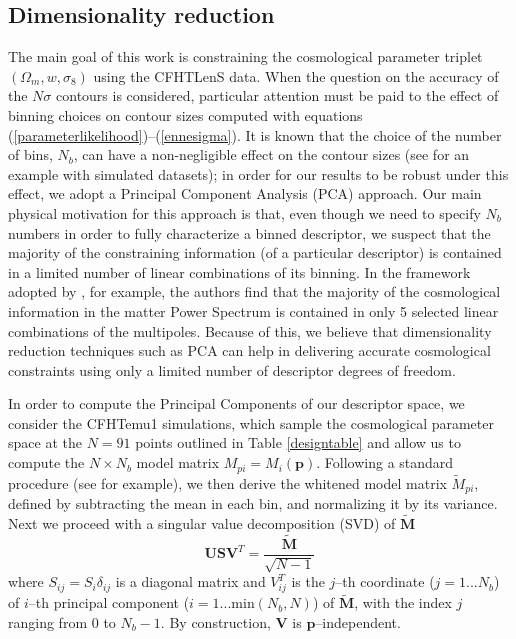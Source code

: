 \documentclass[reprint,aps,prd,superscriptaddress,showkeys,showpacs]{revtex4-1}
\begin{document}
\subsection{Dimensionality reduction}
\label{pcasection}
The main goal of this work is constraining the cosmological parameter triplet $(\Omega_m,w,\sigma_8)$ using the CFHTLenS data. When the question on the accuracy of the $N\sigma$ contours is considered, particular attention must be paid to the effect of binning choices on contour sizes computed with equations (\ref{parameterlikelihood})--(\ref{ennesigma}). It is known that the choice of the number of bins, $N_b$, can have a non-negligible effect on the contour sizes (see \citep{Petri2013} for an example with simulated datasets); in order for our results to be robust under this effect, we adopt a Principal Component Analysis (PCA) approach. Our main physical motivation for this approach is that, even though we need to specify $N_b$ numbers in order to fully characterize a binned descriptor, we suspect that the majority of the constraining information (of a particular descriptor) is contained in a limited number of linear combinations of its binning. In the framework adopted by \citep{coyote2}, for example, the authors find that the majority of the cosmological information in the matter Power Spectrum is contained in only 5 selected linear combinations of the multipoles. Because of this, we believe that dimensionality reduction techniques such as PCA can help in delivering accurate cosmological constraints using only a limited number of descriptor degrees of freedom. 

In order to compute the Principal Components of our descriptor space, we consider the CFHTemu1 simulations, which sample the cosmological parameter space at the $N=91$ points outlined in Table \ref{designtable} and allow us to compute the $N\times N_b$ model matrix $M_{pi}=M_i(\mathbf{p})$. Following a standard procedure (see \citep{astroMLText} for example), we then derive the whitened model matrix $\tilde{M}_{pi}$, defined by subtracting the mean in each bin, and normalizing it by its variance. Next we proceed with a singular value decomposition (SVD) of $\mathbf{\tilde{M}}$
\begin{equation}
\label{svd}
\mathbf{U}\mathbf{S} \mathbf{V}^T=\frac{\mathbf{\tilde{M}}}{\sqrt{N-1}}
\end{equation}   
%
where $S_{ij}=S_i\delta_{ij}$ is a diagonal matrix and $V^T_{ij}$ is the $j$--th coordinate ($j=1...N_b$) of $i$--th principal component ($i=1...\mathrm{min}(N_b,N)$) of $\mathbf{\tilde{M}}$, with the index $j$ ranging from $0$ to $N_b-1$. By construction, $\mathbf{V}$ is $\mathbf{p}$--independent.
\end{document}
